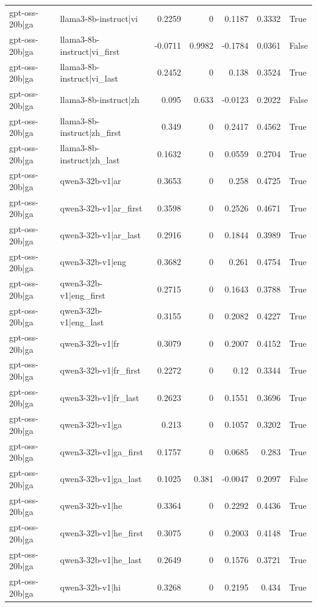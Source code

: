 \begin{table}
\begin{tabular}{l l r r r r l}
gpt-oss-20b|ga & llama3-8b-instruct|vi & 0.2259 & 0 & 0.1187 & 0.3332 & True \\
gpt-oss-20b|ga & llama3-8b-instruct|vi_first & -0.0711 & 0.9982 & -0.1784 & 0.0361 & False \\
gpt-oss-20b|ga & llama3-8b-instruct|vi_last & 0.2452 & 0 & 0.138 & 0.3524 & True \\
gpt-oss-20b|ga & llama3-8b-instruct|zh & 0.095 & 0.633 & -0.0123 & 0.2022 & False \\
gpt-oss-20b|ga & llama3-8b-instruct|zh_first & 0.349 & 0 & 0.2417 & 0.4562 & True \\
gpt-oss-20b|ga & llama3-8b-instruct|zh_last & 0.1632 & 0 & 0.0559 & 0.2704 & True \\
gpt-oss-20b|ga & qwen3-32b-v1|ar & 0.3653 & 0 & 0.258 & 0.4725 & True \\
gpt-oss-20b|ga & qwen3-32b-v1|ar_first & 0.3598 & 0 & 0.2526 & 0.4671 & True \\
gpt-oss-20b|ga & qwen3-32b-v1|ar_last & 0.2916 & 0 & 0.1844 & 0.3989 & True \\
gpt-oss-20b|ga & qwen3-32b-v1|eng & 0.3682 & 0 & 0.261 & 0.4754 & True \\
gpt-oss-20b|ga & qwen3-32b-v1|eng_first & 0.2715 & 0 & 0.1643 & 0.3788 & True \\
gpt-oss-20b|ga & qwen3-32b-v1|eng_last & 0.3155 & 0 & 0.2082 & 0.4227 & True \\
gpt-oss-20b|ga & qwen3-32b-v1|fr & 0.3079 & 0 & 0.2007 & 0.4152 & True \\
gpt-oss-20b|ga & qwen3-32b-v1|fr_first & 0.2272 & 0 & 0.12 & 0.3344 & True \\
gpt-oss-20b|ga & qwen3-32b-v1|fr_last & 0.2623 & 0 & 0.1551 & 0.3696 & True \\
gpt-oss-20b|ga & qwen3-32b-v1|ga & 0.213 & 0 & 0.1057 & 0.3202 & True \\
gpt-oss-20b|ga & qwen3-32b-v1|ga_first & 0.1757 & 0 & 0.0685 & 0.283 & True \\
gpt-oss-20b|ga & qwen3-32b-v1|ga_last & 0.1025 & 0.381 & -0.0047 & 0.2097 & False \\
gpt-oss-20b|ga & qwen3-32b-v1|he & 0.3364 & 0 & 0.2292 & 0.4436 & True \\
gpt-oss-20b|ga & qwen3-32b-v1|he_first & 0.3075 & 0 & 0.2003 & 0.4148 & True \\
gpt-oss-20b|ga & qwen3-32b-v1|he_last & 0.2649 & 0 & 0.1576 & 0.3721 & True \\
gpt-oss-20b|ga & qwen3-32b-v1|hi & 0.3268 & 0 & 0.2195 & 0.434 & True \\

\end{tabular}
\end{table}
